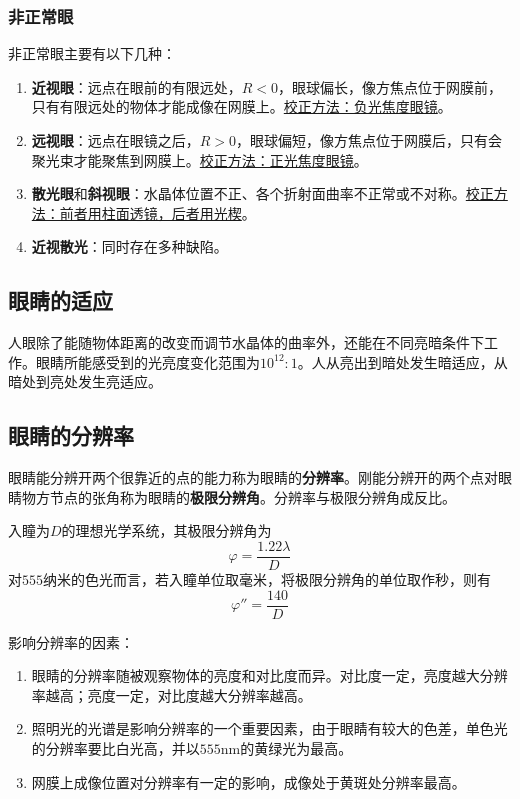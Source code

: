 \documentclass[cn,10pt,chinesefont=founder,math=newtx,cite=super,twoside]{elegantbook}
\begin{document}
\subsubsection{非正常眼}
非正常眼主要有以下几种：
\begin{enumerate}
	\item \textbf{近视眼}：远点在眼前的有限远处，$R<0$，眼球偏长，像方焦点位于网膜前，只有有限远处的物体才能成像在网膜上。\uline{校正方法：负光焦度眼镜}。
	\item \textbf{远视眼}：远点在眼镜之后，$R>0$，眼球偏短，像方焦点位于网膜后，只有会聚光束才能聚焦到网膜上。\uline{校正方法：正光焦度眼镜}。
	\item \textbf{散光眼}和\textbf{斜视眼}：水晶体位置不正、各个折射面曲率不正常或不对称。\uline{校正方法：前者用柱面透镜，后者用光楔}。
	\item \textbf{近视散光}：同时存在多种缺陷。
\end{enumerate}

\subsection{眼睛的适应}
人眼除了能随物体距离的改变而调节水晶体的曲率外，还能在不同亮暗条件下工作。眼睛所能感受到的光亮度变化范围为$10^{12}:1$。人从亮出到暗处发生暗适应，从暗处到亮处发生亮适应。

\subsection{眼睛的分辨率}
眼睛能分辨开两个很靠近的点的能力称为眼睛的\textbf{分辨率}。刚能分辨开的两个点对眼睛物方节点的张角称为眼睛的\textbf{极限分辨角}。分辨率与极限分辨角成反比。

入瞳为$D$的理想光学系统，其极限分辨角为
\begin{equation}
\varphi=\frac{1.22\lambda}{D}
\label{eq:limiting-angle-of-resolution}
\end{equation}
对$555$纳米的色光而言，若入瞳单位取毫米，将极限分辨角的单位取作秒，则有
\begin{equation}
\varphi''=\frac{140}{D}
\end{equation}

\begin{note}
	影响分辨率的因素：
	\begin{enumerate}
		\item 眼睛的分辨率随被观察物体的亮度和对比度而异。对比度一定，亮度越大分辨率越高；亮度一定，对比度越大分辨率越高。
		\item 照明光的光谱是影响分辨率的一个重要因素，由于眼睛有较大的色差，单色光的分辨率要比白光高，并以$555$nm的黄绿光为最高。
		\item 网膜上成像位置对分辨率有一定的影响，成像处于黄斑处分辨率最高。
	\end{enumerate}
\end{note}
\end{document}
